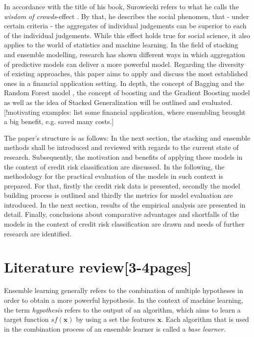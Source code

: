 \documentclass[12pt]{article}
\begin{document}
In accordance with the title of his book, Surowiecki refers to what he calls the \textit{wisdom of crowds}-effect \cite{surowiecki2005wisdom}. By that, he describes the social phenomen, that - under certain criteria - the aggregates of individual judgements can be superior to each of the individual judgements. While this effect holds true for social science, it also applies to the world of statistics and machine learning. In the field of stacking and ensemble modelling, research has shown different ways in which aggregation of predictive models can deliver a more powerful model. Regarding the diversity of existing approaches, this paper aims to apply and discuss the most established ones in a financial application setting. In depth, the concept of Bagging and the Random Forest model \citep{breiman1996bagging, breiman2001random}, the concept of boosting and the Gradient Boosting model \cite{freund1996experiments, friedman2002stochastic} as well as the idea of Stacked Generalization \citep{wolpert1992stacked} will be outlined and evaluated. [!motivating examples: list some financial application, where ensembling brought a big benefit, e.g. saved many costs.]

The paper's structure is as follows: In the next section, the stacking and ensemble methods shall be introduced and reviewed with regards to the current state of research. Subsequently, the motivation and benefits of applying these models in the context of credit risk classification are discussed. In the following, the methodology for the practical evaluation of the models in such context is prepared.  For that, firstly the credit risk data is presented, secondly the model building process is outlined and thirdly the metrics for model evaluation are introduced. In the next section, results of the empirical analysis are presented in detail. Finally, conclusions about comparative advantages and shortfalls of the models in the context of credit risk classification are drawn and needs of further research are identified.


\section{Literature review[3-4pages]}
Ensemble learning generally refers to the combination of multiple hypotheses in order to obtain a more powerful hypothesis. In the context of machine learning, the term \textit{hypothesis} refers to the output of an algorithm, which aims to learn a target function $sf(\mathbf{x})$ by using a set the features $\mathbf{x}$. Each algorithm that is used in the combination process of an ensemble learner is called a \textit{base learner}.
\end{document}
